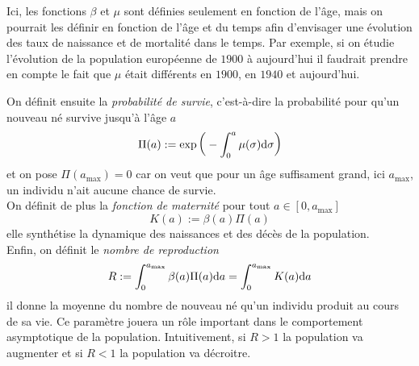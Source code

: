 \begin{remark}
    Ici, les fonctions $\beta$ et $\mu$ sont définies seulement 
    en fonction de l'âge, mais on pourrait les définir en fonction de l'âge et du temps afin d'envisager une évolution des taux de naissance et de mortalité dans le temps. Par exemple, si on étudie l'évolution de la population européenne de $1900$ à aujourd'hui il faudrait prendre en compte le fait que $\mu$ était différents en $1900$, en $1940$ et aujourd'hui.
\end{remark}

On définit ensuite la \textcolor{astral}{\textit{probabilité de survie}}, c'est-à-dire la probabilité pour qu'un nouveau né survive jusqu'à l'âge $a$
\begin{equation*}
    \Pi (a) := \exp\bigg(-\int_{0}^a \mu(\sigma)\mathrm{d} \sigma\bigg)
\end{equation*}
et on pose $\Pi(a_{\max}) = 0$ car on veut que pour un âge suffisament grand, ici $a_{\max}$, un individu n'ait aucune chance de survie.
\\
On définit de plus la \textcolor{astral}{\textit{fonction de maternité}} pour tout $a \in [0,a_{\max}]$
\begin{equation*}
    K(a) := \beta(a)\Pi(a)
\end{equation*}
elle synthétise la dynamique des naissances et des décès de la population.
\\
Enfin, on définit le \textcolor{astral}{\textit{nombre de reproduction}}
\begin{equation*}
    R := \int_0^{a_{\max}} \beta(a)\Pi(a)\mathrm{d} a = \int_0^{a_{\max}} K(a)\mathrm{d} a
\end{equation*}
il donne la moyenne du nombre de nouveau né qu'un individu produit au cours de sa vie. Ce paramètre jouera un rôle important dans le comportement asymptotique de la population. Intuitivement, si $R>1$ la population va augmenter et si $R<1$ la population va décroitre.

